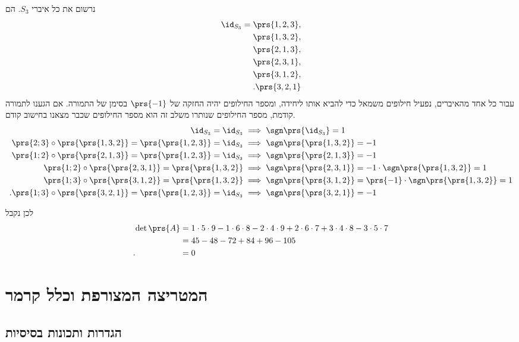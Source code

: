 \documentclass[a4paper,10pt,twoside,openany]{book}
\begin{document}
\begin{solution}
נרשום את כל איברי
$S_3$.
הם
\begin{align*}
\id_{S_3} = \prs{1, 2, 3}, \\
\prs{1, 3, 2}, \\
\prs{2, 1, 3}, \\
\prs{2, 3, 1}, \\
\prs{3, 1, 2}, \\
\text{.} \prs{3, 2, 1}
\end{align*}
עבור כל אחד מהאיברים, נפעיל חילופים משמאל כדי להביא אותו ליחידה, ומספר החילופים יהיה החזקה של $\prs{-1}$ בסימן של התמורה. אם הגענו לתמורה קודמת, מספר החילופים שנותרו משלב זה הוא מספר החילופים שכבר מצאנו בחישוב קודם.
\begin{align*}
\id_{S_3} = \id_{S_3} &\implies \sgn\prs{\id_{S_3}} = 1\\
\prs{2;3} \circ \prs{\prs{1, 3, 2}} = \prs{\prs{1, 2, 3}} = \id_{S_3} &\implies \sgn\prs{\prs{1, 3, 2}} = -1 \\
\prs{1;2} \circ \prs{\prs{2, 1, 3}} = \prs{\prs{1, 2, 3}} = \id_{S_3} &\implies \sgn\prs{\prs{2,1,3}} = -1 \\
\prs{1;2} \circ \prs{\prs{2, 3, 1}} = \prs{\prs{1, 3, 2}} &\implies \sgn\prs{\prs{2, 3, 1}} = -1 \cdot \sgn\prs{\prs{1, 3, 2}} = 1 \\
\prs{1;3} \circ \prs{\prs{3, 1, 2}} = \prs{\prs{1, 3, 2}} &\implies \sgn\prs{\prs{3, 1, 2}} = \prs{-1} \cdot \sgn\prs{\prs{1, 3, 2}} = 1 \\
\text{.} \prs{1;3} \circ \prs{\prs{3,2,1}} = \prs{\prs{1,2,3}} = \id_{S_3} &\implies \sgn\prs{\prs{3,2,1}} = -1
\end{align*}

לכן נקבל
\begin{align*}
\det\prs{A} &= 1\cdot 5 \cdot 9 - 1 \cdot 6 \cdot 8 - 2 \cdot 4 \cdot 9 + 2 \cdot 6 \cdot 7 + 3 \cdot 4 \cdot 8 - 3 \cdot 5 \cdot 7
\\&= 45 - 48 - 72 + 84 + 96 - 105
\\ \text{.} \hphantom{\det\prs{A}} &= 0
\end{align*}
\end{solution}

\chapter{המטריצה המצורפת וכלל קרמר}

\section{הגדרות ותכונות בסיסיות}
\end{document}
